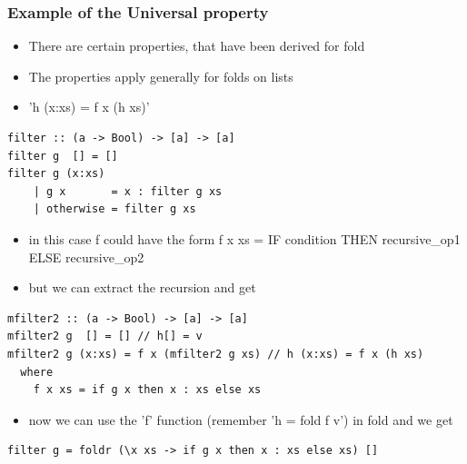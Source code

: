 \documentclass[10pt]{beamer}
\begin{document}
\begin{frame}[fragile]
\frametitle{Example of the Universal property}
\begin{itemize}
\item There are certain properties, that have been derived for fold 
\item The properties apply generally for folds on lists 
\item 'h (x:xs) = f x (h xs)'
\end{itemize}

\begin{lstlisting}
filter :: (a -> Bool) -> [a] -> [a]
filter g  [] = []
filter g (x:xs)  
    | g x       = x : filter g xs 
    | otherwise = filter g xs
\end{lstlisting}

\begin{itemize}
\item in this case f could have the form f x xs = IF condition THEN recursive\_op1 ELSE recursive\_op2 
\item but we can extract the recursion and get 
\end{itemize}
\begin{lstlisting}
mfilter2 :: (a -> Bool) -> [a] -> [a]
mfilter2 g  [] = [] // h[] = v
mfilter2 g (x:xs) = f x (mfilter2 g xs) // h (x:xs) = f x (h xs)
  where 
    f x xs = if g x then x : xs else xs 
\end{lstlisting}

\begin{itemize}
\item now we can use the 'f' function (remember 'h = fold f v') in fold and we get
\end{itemize}

\begin{lstlisting}
filter g = foldr (\x xs -> if g x then x : xs else xs) []
\end{lstlisting}

\end{frame}
\end{document}
